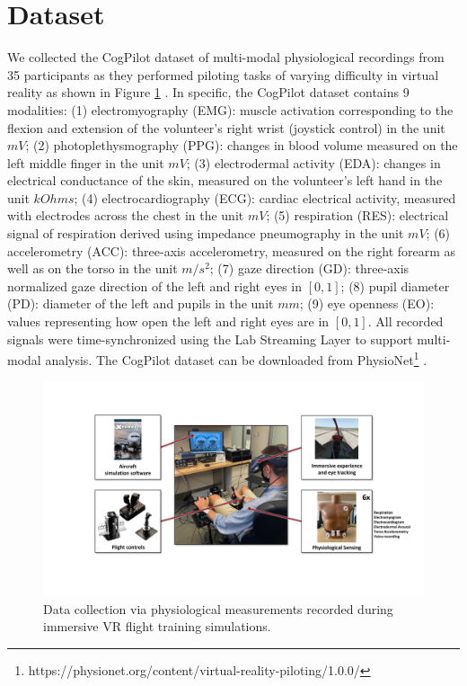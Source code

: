 \documentclass[letterpaper]{article} %
\begin{document}
\section{Dataset}

We collected the CogPilot dataset of multi-modal physiological recordings from 35 participants as they performed piloting tasks of varying difficulty in virtual reality as shown in Figure \ref{fig_cogpilot} \cite{raomultimodal}. In specific, the CogPilot dataset contains 9 modalities: (1) electromyography (EMG): muscle activation corresponding to the flexion and extension of the volunteer’s right wrist (joystick control) in the unit $mV$; (2) photoplethysmography (PPG): changes in blood volume measured on the left middle finger in the unit $mV$; (3) electrodermal activity (EDA): changes in electrical conductance of the skin, measured on the volunteer’s left hand in the unit $kOhms$; (4) electrocardiography (ECG): cardiac electrical activity, measured with electrodes across the chest in the unit $mV$; (5) respiration (RES): electrical signal of respiration derived using impedance pneumography in the unit $mV$; (6) accelerometry (ACC): three-axis accelerometry, measured on the right forearm as well as on the torso in the unit $m/s^2$; (7) gaze direction (GD): three-axis normalized gaze direction of the left and right eyes in $[0,1]$; (8) pupil diameter (PD): diameter of the left and pupils in the unit $mm$; (9) eye openness (EO): values representing how open the left and right eyes are in $[0,1]$. All recorded signals were time-synchronized using the Lab Streaming Layer to support multi-modal analysis. The CogPilot dataset can be downloaded from PhysioNet\footnote{https://physionet.org/content/virtual-reality-piloting/1.0.0/} \cite{goldberger2000physiobank}.

\begin{figure}[t]
    \centering 
    \includegraphics[width=\columnwidth]{figures/CogPilotExperiment.pdf}
    \caption{Data collection via physiological measurements recorded during immersive VR flight training simulations.}
    \label{fig_cogpilot}
\end{figure}
\end{document}
